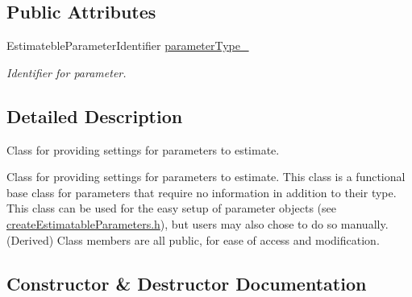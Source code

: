 \subsection*{Public Attributes}
\begin{DoxyCompactItemize}
\item 
Estimateble\+Parameter\+Identifier \hyperlink{classtudat_1_1estimatable__parameters_1_1EstimatableParameterSettings_a5879aeacc6f924dd33459251044bdc6e}{parameter\+Type\+\_\+}
\begin{DoxyCompactList}\small\item\em Identifier for parameter. \end{DoxyCompactList}\end{DoxyCompactItemize}


\subsection{Detailed Description}
Class for providing settings for parameters to estimate. 

Class for providing settings for parameters to estimate. This class is a functional base class for parameters that require no information in addition to their type. This class can be used for the easy setup of parameter objects (see \hyperlink{createEstimatableParameters_8h_source}{create\+Estimatable\+Parameters.\+h}), but users may also chose to do so manually. (Derived) Class members are all public, for ease of access and modification. 

\subsection{Constructor \& Destructor Documentation}

